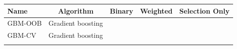 \begin{longtable}[c]{@{}lcccc@{}}
\toprule
\begin{minipage}[b]{0.14\columnwidth}\raggedright\strut
Name
\strut\end{minipage} &
\begin{minipage}[b]{0.35\columnwidth}\centering\strut
Algorithm
\strut\end{minipage} &
\begin{minipage}[b]{0.11\columnwidth}\centering\strut
Binary
\strut\end{minipage} &
\begin{minipage}[b]{0.13\columnwidth}\centering\strut
Weighted
\strut\end{minipage} &
\begin{minipage}[b]{0.13\columnwidth}\centering\strut
Selection Only
\strut\end{minipage}\tabularnewline
\midrule
\endhead
\begin{minipage}[t]{0.14\columnwidth}\raggedright\strut
GBM-OOB
\strut\end{minipage} &
\begin{minipage}[t]{0.35\columnwidth}\centering\strut
Gradient boosting
\strut\end{minipage} &
\begin{minipage}[t]{0.11\columnwidth}\centering\strut
\strut\end{minipage} &
\begin{minipage}[t]{0.13\columnwidth}\centering\strut
\strut\end{minipage} &
\begin{minipage}[t]{0.13\columnwidth}\centering\strut
\strut\end{minipage}\tabularnewline
\begin{minipage}[t]{0.14\columnwidth}\raggedright\strut
GBM-CV
\strut\end{minipage} &
\begin{minipage}[t]{0.35\columnwidth}\centering\strut
Gradient boosting
\strut\end{minipage} &
\begin{minipage}[t]{0.11\columnwidth}\centering\strut
\strut\end{minipage} &
\begin{minipage}[t]{0.13\columnwidth}\centering\strut
\strut\end{minipage} &
\begin{minipage}[t]{0.13\columnwidth}\centering\strut
\strut\end{minipage}\tabularnewline
\begin{minipage}[t]{0.14\columnwidth}\raggedright\strut

\end{minipage}
\end{longtable}
